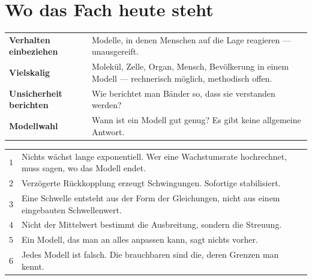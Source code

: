 \section{Wo das Fach heute steht}

\begin{merksatz}
\begin{center}
{\small
\renewcommand{\arraystretch}{1.5}
\begin{tabular}{@{}P{3.2cm}P{5.4cm}@{}}
\toprule
\textbf{Verhalten einbeziehen} & Modelle, in denen Menschen auf die Lage reagieren --- unausgereift.\\
\textbf{Vielskalig} & Molekül, Zelle, Organ, Mensch, Bevölkerung in einem Modell --- rechnerisch möglich, methodisch offen.\\
\textbf{Unsicherheit berichten} & Wie berichtet man Bän\-der so, dass sie verstanden werden?\\
\textbf{Modellwahl} & Wann ist ein Modell gut genug? Es gibt keine allgemeine Antwort.\\
\bottomrule
\end{tabular}}
\end{center}

\begin{center}
\begin{minipage}{0.88\textwidth}
\end{minipage}
\end{center}
\end{merksatz}

\begin{merksatz}
\begin{center}
{\small
\renewcommand{\arraystretch}{1.55}
\begin{tabular}{@{}P{0.7cm}P{7.7cm}@{}}
\toprule
$1$ & Nichts wächst lange exponentiell. Wer eine Wachstumsrate hochrechnet, muss sagen, wo das Modell endet.\\
$2$ & Verzögerte Rückkopplung erzeugt Schwingungen. Sofortige stabilisiert.\\
$3$ & Eine Schwelle entsteht aus der Form der Gleichungen, nicht aus einem eingebauten Schwellenwert.\\
$4$ & Nicht der Mittelwert bestimmt die Ausbreitung, sondern die Streuung.\\
$5$ & Ein Modell, das man an alles anpassen kann, sagt nichts vorher.\\
$6$ & Jedes Modell ist falsch. Die brauchbaren sind die, deren Grenzen man kennt.\\
\bottomrule
\end{tabular}}
\end{center}
\end{merksatz}


